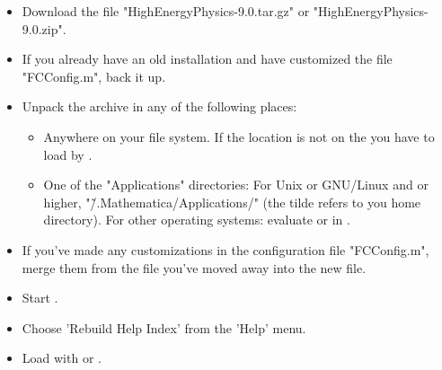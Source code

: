 \begin{itemize}

\item{Download the file "HighEnergyPhysics-9.0.tar.gz" or
"HighEnergyPhysics-9.0.zip".}

\item{If you already have an old installation and have customized the file "FCConfig.m", back it up.}

\item{Unpack the archive in any of the following places:

\begin{itemize}

\item{Anywhere on your file system. If the location is not on the \mma {} you
have to load \fc by .} 

\item{One of the \mma "Applications" directories: For {\sc Unix} or {\sc GNU/Linux} and
 or higher, "\~/.Mathematica/Applications/" (the tilde refers to you home directory).
For other operating systems: evaluate  or  in \mma.}
\end{itemize}
}

\item{If you've made any customizations in the configuration file "FCConfig.m", merge them from the file you've moved away into the new file.}

\item{Start \mma.}

\item{Choose 'Rebuild Help Index' from the 'Help' menu.}

\item{Load \fc with  or .}

\end{itemize}



